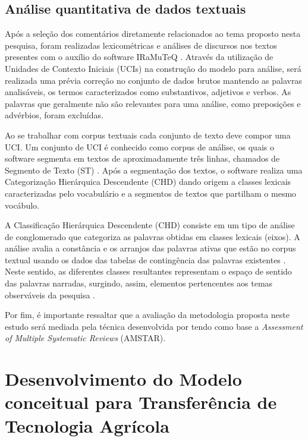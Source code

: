\subsection{Análise quantitativa de dados textuais}

Após a seleção dos comentários diretamente relacionados ao tema proposto nesta pesquisa, foram realizadas lexicométricas e análises de discursos nos textos presentes com o auxílio do software IRaMuTeQ \cite{conde_lexicometria_2015,da_silva_cezar_panorama_2018}. Através da utilização de Unidades de Contexto Iniciais (UCIs) na construção do modelo para análise, será realizada uma prévia correção no conjunto de dados brutos mantendo as palavras analisáveis, os termos caracterizados como substantivos, adjetivos e verbos. As palavras que geralmente não são relevantes para uma análise, como preposições e advérbios, foram excluídas.

Ao se trabalhar com corpus textuais cada conjunto de texto deve compor uma UCI. Um conjunto de UCI é conhecido como corpus de análise, os quais o software segmenta em textos de aproximadamente três linhas, chamados de Segmento de Texto (ST) \cite{fernandes_avaliacao_2018}. Após a segmentação dos textos, o software realiza uma Categorização Hierárquica Descendente (CHD) dando origem a classes lexicais caracterizadas pelo vocabulário e a segmentos de textos que partilham o mesmo vocábulo.

A Classificação Hierárquica Descendente (CHD) consiste em um tipo de análise de conglomerado que categoriza as palavras obtidas em classes lexicais (eixos). A análise avalia a constância e os arranjos das palavras ativas que estão no corpus textual usando os dados das tabelas de contingência das palavras existentes \cite{carvalho_utilizacao_2020,mendes_mapping_2019}. Neste sentido, as diferentes classes resultantes representam o espaço de sentido das palavras narradas, surgindo, assim, elementos pertencentes aos temas observáveis da pesquisa \cite{gavasso_revisao_2016}. 

Por fim, é importante ressaltar que a avaliação da metodologia proposta neste estudo será mediada pela técnica desenvolvida por  tendo como base a \textit{Assessment of Multiple Systematic Reviews} (AMSTAR).


\section{Desenvolvimento do Modelo conceitual para Transferência de Tecnologia Agrícola}


